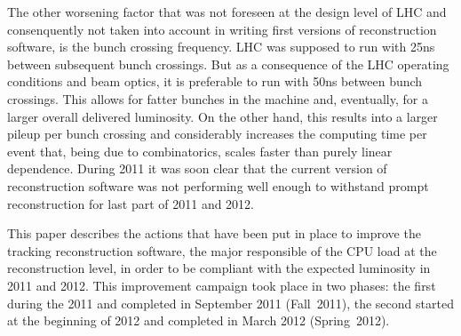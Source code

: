The other worsening factor that was not foreseen at the design level
of LHC and consenquently not taken into account in writing first
versions of reconstruction software, is the bunch crossing
frequency. LHC was supposed to run with 25ns between subsequent bunch
crossings. But as a consequence of the LHC operating conditions and
beam optics, it is preferable to run with 50ns between bunch
crossings. This allows for fatter bunches in the machine and,
eventually, for a larger overall delivered luminosity. On the other
hand, this results into a larger pileup per bunch crossing and
considerably increases the computing time per event that, being due to
combinatorics, scales faster than purely linear dependence.
During 2011 it was soon clear that the current version of
reconstruction software was not performing well enough to withstand prompt
reconstruction for last part of 2011 and 2012. 

This paper describes the actions that have been put in place to
improve the tracking reconstruction software, the major responsible of
the CPU load at the reconstruction level, in order to be compliant
with the expected luminosity in 2011 and 2012. This improvement
campaign took place in two phases: the first during the 2011 and
completed in September 2011 (Fall~2011), the second started at the
beginning of 2012 and completed in March 2012 (Spring~2012).
